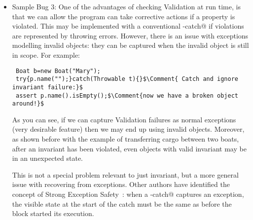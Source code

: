 \begin{itemize}
\item Sample Bug 3:
One of the advantages of checking Validation at run time, is that
we can allow the program can take corrective actions if a property is violated.
This may be implemented with a conventional \Q@try-catch@ if violations are represented by throwing errors.
However, there is an issue with exceptions modelling invalid objects: they can be captured when the invalid object is still in scope. For example:

\begin{lstlisting}
 Boat b=new Boat("Mary");
 try{p.name("");}catch(Throwable t){}$\Comment{ Catch and ignore invariant failure:}$
 assert p.name().isEmpty();$\Comment{now we have a broken object around!}$
\end{lstlisting}

As you can see, if we can capture Validation failures as normal exceptions (very desirable feature) then we may end up using invalid objects.
Moreover,
 as shown before with the example of transferring cargo between two boats,
after an invariant has been violated, even objects with valid invariant may be in an unexpected state.

This is not a special problem relevant to just invariant, but a more general issue with
recovering from exceptions.
Other authors have identified the concept of Strong Exception Safety~\cite{Abrahams2000}:
when a \Q@try-catch@ captures an exception, the visible state at the start of the catch must be the same as before the \Q@try@ block started its execution.
\end{itemize}

